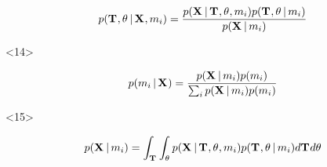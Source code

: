 \begin{frame}[t]
\begin{minipage}[c][0.1\textheight][c]{\linewidth}
\begin{onlyenv}
\begin{displaybox}[0.85\linewidth]
\begin{minipage}[c][0.1\textheight][c]{\linewidth}
\begin{onlyenv}
                        \[
                            p(
                              \divTimeMapVector,
                              \allParameters{}
                              \given \alignmentVector, \divModel{i})
                              =
                            \frac{
                                p(\alignmentVector \given
                                  \divTimeMapVector,
                                  \allParameters{},
                                  \divModel{i}
                                  )
                                  p(
                                    \divTimeMapVector,
                                    \allParameters{}
                                    \given \divModel{i}
                                    )
                                }{p(\alignmentVector \given \divModel{i})}
                        \]
                    \end{onlyenv}
                    \begin{onlyenv}<14>

                        \vspace{3.5mm}

                        \[
                            p(\divModel{i} \given \alignmentVector) =
                            \frac{
                                p(\alignmentVector \given \divModel{i})
                                p(\divModel{i})
                            }{
                                \sum_{i} p(\alignmentVector \given \divModel{i})
                                p(\divModel{i})
                            }
                        \]
                    \end{onlyenv}
                    \begin{onlyenv}<15>

                        \vspace{2mm}

                        \[
                            p(\alignmentVector \given \divModel{i}) =
                            \int_{\divTimeMapVector} \int_{\allParameters{}}
                            p(\alignmentVector \given \divTimeMapVector, \allParameters{}, \divModel{i})
                            p(\divTimeMapVector, \allParameters{} \given \divModel{i})
                            d\divTimeMapVector d\allParameters{}
                        \]
                    \end{onlyenv}
                \end{minipage}
            \end{displaybox}
        \end{onlyenv}
    \end{minipage}
\end{frame}

